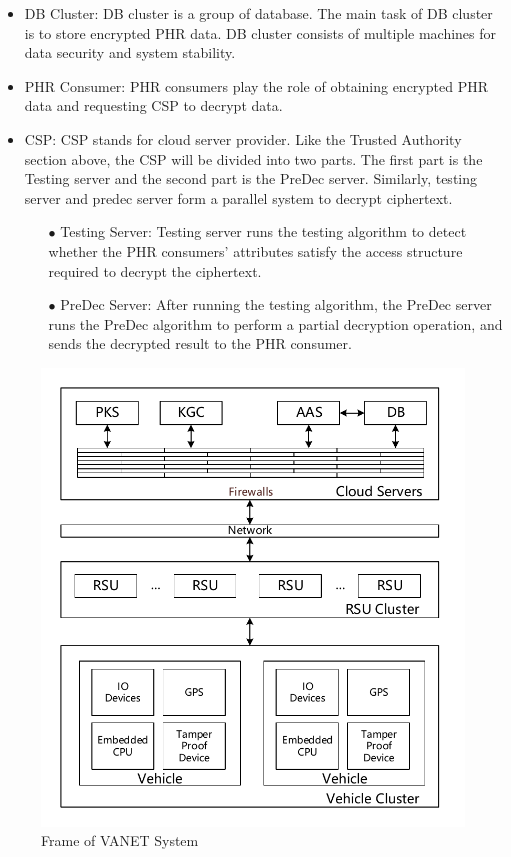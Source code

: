 \documentclass[smallextended]{svjour3}       %
\begin{document}
\begin{itemize}
\begin{itemize}
\begin{itemize}
							\end{itemize}
		\item DB Cluster: DB cluster is a group of database. 
						  The main task of DB cluster is to store encrypted PHR data.
						  DB cluster consists of multiple machines for data security and system stability.
		\item PHR Consumer: PHR consumers play the role of obtaining encrypted PHR data and requesting CSP to decrypt data. 
		\item CSP: CSP stands for cloud server provider.
				   Like the Trusted Authority section above, the CSP will be divided into two parts.
				   The first part is the Testing server and the second part is the PreDec server.
				   Similarly, testing server and predec server form a parallel system to decrypt ciphertext.
				   \begin{itemize}
					   \item[$\bullet$] Testing Server: Testing server runs the testing algorithm to detect whether the PHR consumers' attributes satisfy the access structure required to decrypt the ciphertext.
					   \item[$\bullet$] PreDec Server: After running the testing algorithm, the PreDec server runs the PreDec algorithm to perform a partial decryption operation, and sends the decrypted result to the PHR consumer.
				   \end{itemize}
	\end{itemize}

	
	\begin{figure}[htb]
		\centering
		\includegraphics[width=4.5in, keepaspectratio]{layer.pdf}
		\caption{Frame of VANET System}
		\label{frame}
	\end{figure}



\end{itemize}
\end{document}
